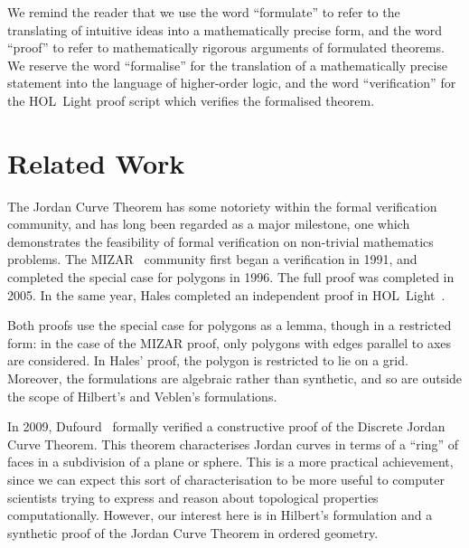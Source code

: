 We remind the reader that we use the word ``formulate'' to refer to the translating of intuitive ideas into a mathematically precise form, and the word ``proof'' to refer to mathematically rigorous arguments of formulated theorems. We reserve the word ``formalise'' for the translation of a mathematically precise statement into the language of higher-order logic, and the word ``verification'' for the HOL~Light proof script which verifies the formalised theorem.

\section{Related Work}
The Jordan Curve Theorem has some notoriety within the formal verification community, and has long been regarded as a major milestone, one which  demonstrates the feasibility of formal verification on non-trivial mathematics problems. The MIZAR~\cite{MizarMathematicalVernacular} community first began a verification in 1991, and completed the special case for polygons in 1996. The full proof was completed in 2005. In the same year, Hales completed an independent proof in HOL~Light~\cite{HalesJordanCurve}. 

Both proofs use the special case for polygons as a lemma, though in a restricted form: in the case of the MIZAR proof, only polygons with edges parallel to axes are considered. In Hales' proof, the polygon is restricted to lie on a grid. Moreover, the formulations are algebraic rather than synthetic, and so are outside the scope of Hilbert's and Veblen's formulations.

In 2009, Dufourd~\cite{DufourdJordanCurve} formally verified a constructive proof of the Discrete Jordan Curve Theorem. This theorem characterises Jordan curves in terms of a ``ring'' of faces in a subdivision of a plane or sphere. This is a more practical achievement, since we can expect this sort of characterisation to be more useful to computer scientists trying to express and reason about topological properties computationally. However, our interest here is in Hilbert's formulation and a synthetic proof of the Jordan Curve Theorem in ordered geometry.


